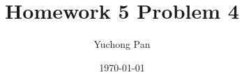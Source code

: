 \documentclass[letterpaper, reqno,11pt]{article}
\begin{document}
\title{Homework 5 Problem 4}
\author{Yuchong Pan}
\date{\today}
\newtheorem{theorem}{Theorem}
\newtheorem{lemma}[theorem]{Lemma}
\newtheorem{corollary}[theorem]{Corollary}
\newtheorem{fact}[theorem]{Fact}
\newtheorem{proposition}[theorem]{Proposition}
\newtheorem{claim}{Claim}
\newtheorem{exercise}{Exercise}
\theoremstyle{definition}
\newtheorem{definition}[theorem]{Definition}
\newtheorem{solution}{Solution}
%

\begin{framed}
 \hfill \thedate
\begin{center}
\Large{\thetitle}
\end{center}
\end{framed}
\end{document}
